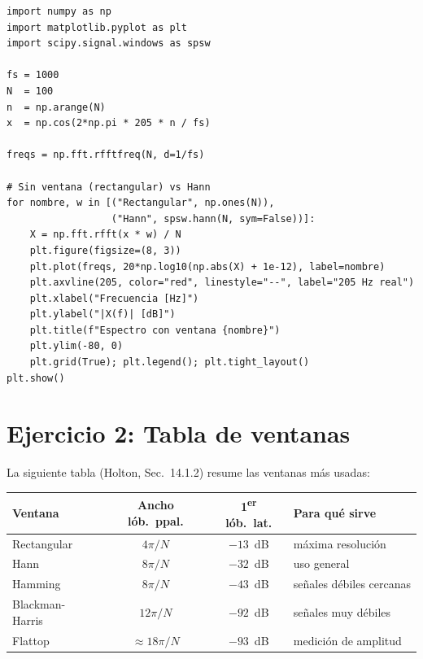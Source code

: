 \documentclass[11pt, a4paper]{article}
\begin{document}
\begin{lstlisting}[style=pystyle, caption={Visualizaci\'on r\'apida del desparramo}]
import numpy as np
import matplotlib.pyplot as plt
import scipy.signal.windows as spsw

fs = 1000
N  = 100
n  = np.arange(N)
x  = np.cos(2*np.pi * 205 * n / fs)

freqs = np.fft.rfftfreq(N, d=1/fs)

# Sin ventana (rectangular) vs Hann
for nombre, w in [("Rectangular", np.ones(N)),
                  ("Hann", spsw.hann(N, sym=False))]:
    X = np.fft.rfft(x * w) / N
    plt.figure(figsize=(8, 3))
    plt.plot(freqs, 20*np.log10(np.abs(X) + 1e-12), label=nombre)
    plt.axvline(205, color="red", linestyle="--", label="205 Hz real")
    plt.xlabel("Frecuencia [Hz]")
    plt.ylabel("|X(f)| [dB]")
    plt.title(f"Espectro con ventana {nombre}")
    plt.ylim(-80, 0)
    plt.grid(True); plt.legend(); plt.tight_layout()
plt.show()
\end{lstlisting}

\section*{Ejercicio 2: Tabla de ventanas}

\begin{enun}
La siguiente tabla (Holton, Sec.~14.1.2) resume las ventanas m\'as usadas:

\begin{center}
\small
\begin{tabular}{lccl}
\toprule
\textbf{Ventana} & \textbf{Ancho l\'ob.\ ppal.} & \textbf{1\textsuperscript{er} l\'ob.\ lat.} & \textbf{Para qu\'e sirve} \\
\midrule
Rectangular     & $4\pi/N$   & $-13$~dB  & m\'axima resoluci\'on \\
Hann            & $8\pi/N$   & $-32$~dB  & uso general \\
Hamming         & $8\pi/N$   & $-43$~dB  & se\~nales d\'ebiles cercanas \\
Blackman-Harris & $12\pi/N$  & $-92$~dB  & se\~nales muy d\'ebiles \\
Flattop         & $\approx 18\pi/N$ & $-93$~dB & medici\'on de amplitud \\
\bottomrule
\end{tabular}
\end{center}
\end{enun}
\end{document}

